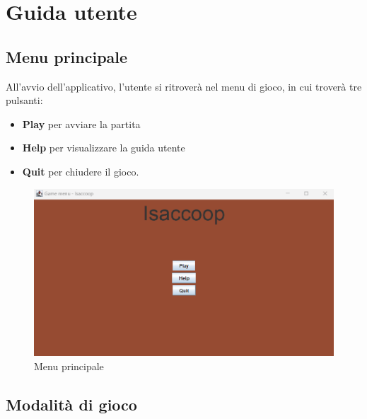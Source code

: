 \documentclass[a4paper,12pt]{report}
\begin{document}
\appendix
\chapter{Guida utente}

\section*{Menu principale}
All'avvio dell'applicativo, l'utente si ritroverà nel menu di gioco, in cui troverà tre pulsanti:
\begin{itemize}
    \item \textbf{Play} per avviare la partita
    \item \textbf{Help} per visualizzare la guida utente 
    \item \textbf{Quit} per chiudere il gioco.
\end{itemize}
\begin{figure}[H]
\centering{}
\includegraphics[width=\textwidth]{img/mainMenu.png}
\caption{Menu principale}
\label{img/standardRoom.png}
\end{figure}

\section*{Modalità di gioco}
\end{document}
